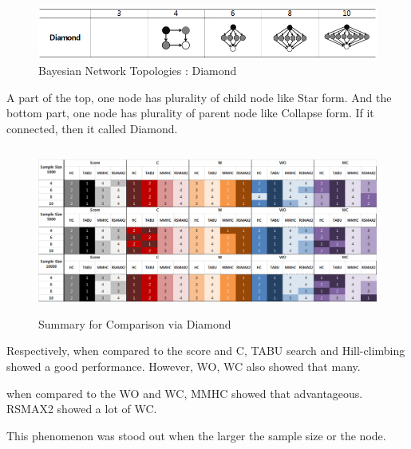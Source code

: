 	\begin{figure}[h]
	\centering
		\includegraphics[height=50pt]{Topologies_Diamond}
		\caption{Bayesian Network Topologies : Diamond}
	\end{figure}	

	A part of the top, one node has plurality of child node like Star form. And the bottom part, one node has plurality of parent node like Collapse form. If it connected, then it called Diamond.
	
\begin{figure}[!bhp]
	\centering
		\includegraphics[height=155pt]{Result_Diamond}
		\caption{Summary for Comparison via Diamond}
	\end{figure}	

Respectively, when compared to the score and C,  TABU search and Hill-climbing showed a good performance. However, WO, WC also showed that many.

when compared to the WO and WC, MMHC showed that advantageous. RSMAX2 showed a lot of WC.

This phenomenon was stood out when the larger the sample size or the node.
	
